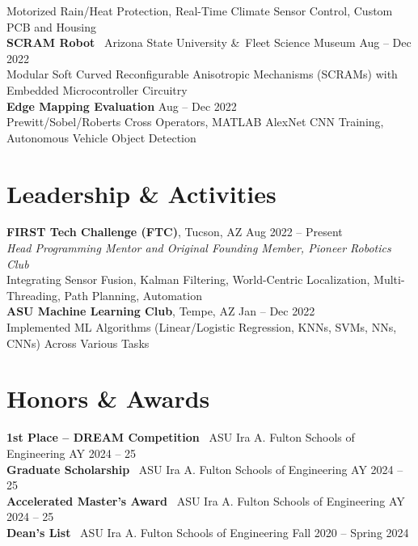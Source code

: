 \documentclass[10pt]{article}
\begin{document}
\hspace*{2em}Motorized Rain/Heat Protection, Real-Time Climate Sensor Control, Custom PCB and Housing
\\
\textbf{SCRAM Robot} \textbar\ Arizona State University \&\ Fleet Science Museum \hfill Aug -- Dec 2022 \\
\hspace*{2em}Modular Soft Curved Reconfigurable Anisotropic Mechanisms (SCRAMs) with Embedded Microcontroller Circuitry
\\
\textbf{Edge Mapping Evaluation} \hfill Aug -- Dec 2022 \\
\hspace*{2em}Prewitt/Sobel/Roberts Cross Operators, MATLAB AlexNet CNN Training, Autonomous Vehicle Object Detection

\section*{Leadership \& Activities}
\textbf{FIRST Tech Challenge (FTC)}, Tucson, AZ \hfill Aug 2022 -- Present \\
\textit{Head Programming Mentor and Original Founding Member, Pioneer Robotics Club}\\
\hspace*{2em}Integrating Sensor Fusion, Kalman Filtering, World-Centric Localization, Multi-Threading, Path Planning, Automation
\\
\textbf{ASU Machine Learning Club}, Tempe, AZ \hfill Jan -- Dec 2022 \\
\hspace*{2em}Implemented ML Algorithms (Linear/Logistic Regression, KNNs, SVMs, NNs, CNNs) Across Various Tasks

\section*{Honors \& Awards}
\textbf{1st Place -- DREAM Competition} \textbar\ ASU Ira A. Fulton Schools of Engineering \hfill AY 2024 -- 25 \\
\textbf{Graduate Scholarship} \textbar\ ASU Ira A. Fulton Schools of Engineering \hfill AY 2024 -- 25 \\
\textbf{Accelerated Master's Award} \textbar\ ASU Ira A. Fulton Schools of Engineering \hfill AY 2024 -- 25\\
\textbf{Dean's List} \textbar\ ASU Ira A. Fulton Schools of Engineering \hfill Fall 2020 -- Spring 2024
\end{document}
